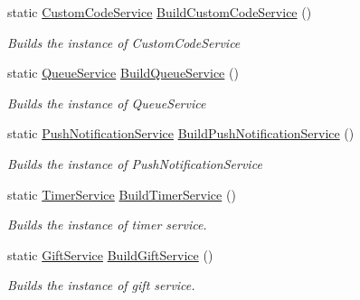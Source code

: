 \begin{DoxyCompactItemize}
static \hyperlink{classcom_1_1shephertz_1_1app42_1_1paas_1_1sdk_1_1csharp_1_1customcode_1_1_custom_code_service}{Custom\+Code\+Service} \hyperlink{classcom_1_1shephertz_1_1app42_1_1paas_1_1sdk_1_1csharp_1_1_app42_a_p_i_ab69b027d7f9a362eadf06aa399e4329d}{Build\+Custom\+Code\+Service} ()
\begin{DoxyCompactList}\small\item\em Builds the instance of Custom\+Code\+Service \end{DoxyCompactList}\item 
static \hyperlink{classcom_1_1shephertz_1_1app42_1_1paas_1_1sdk_1_1csharp_1_1message_1_1_queue_service}{Queue\+Service} \hyperlink{classcom_1_1shephertz_1_1app42_1_1paas_1_1sdk_1_1csharp_1_1_app42_a_p_i_a4a6051f18dc9ad941b14e92832ebb15d}{Build\+Queue\+Service} ()
\begin{DoxyCompactList}\small\item\em Builds the instance of Queue\+Service \end{DoxyCompactList}\item 
static \hyperlink{classcom_1_1shephertz_1_1app42_1_1paas_1_1sdk_1_1csharp_1_1push_notification_1_1_push_notification_service}{Push\+Notification\+Service} \hyperlink{classcom_1_1shephertz_1_1app42_1_1paas_1_1sdk_1_1csharp_1_1_app42_a_p_i_aac410065952d7635b2f907a1ca5a0458}{Build\+Push\+Notification\+Service} ()
\begin{DoxyCompactList}\small\item\em Builds the instance of Push\+Notification\+Service \end{DoxyCompactList}\item 
static \hyperlink{classcom_1_1shephertz_1_1app42_1_1paas_1_1sdk_1_1csharp_1_1timer_1_1_timer_service}{Timer\+Service} \hyperlink{classcom_1_1shephertz_1_1app42_1_1paas_1_1sdk_1_1csharp_1_1_app42_a_p_i_aa8666a23c188b58cf809823f4e4cfe03}{Build\+Timer\+Service} ()
\begin{DoxyCompactList}\small\item\em Builds the instance of timer service. \end{DoxyCompactList}\item 
static \hyperlink{classcom_1_1shephertz_1_1app42_1_1paas_1_1sdk_1_1csharp_1_1gift_1_1_gift_service}{Gift\+Service} \hyperlink{classcom_1_1shephertz_1_1app42_1_1paas_1_1sdk_1_1csharp_1_1_app42_a_p_i_afd43129d3c8695078db6661d1d993f8d}{Build\+Gift\+Service} ()
\begin{DoxyCompactList}\small\item\em Builds the instance of gift service. \end{DoxyCompactList}\end{DoxyCompactItemize}
